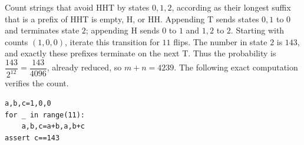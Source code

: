 Count strings that avoid HHT by states $0,1,2$, according as their longest suffix that is a prefix of HHT is empty, H, or HH. Appending T sends states $0,1$ to $0$ and terminates state $2$; appending H sends $0$ to $1$ and $1,2$ to $2$. Starting with counts $(1,0,0)$, iterate this transition for $11$ flips. The number in state $2$ is $143$, and exactly these prefixes terminate on the next T. Thus the probability is $\dfrac{143}{2^{12}}=\dfrac{143}{4096}$, already reduced, so $m+n=\boxed{4239}$. The following exact computation verifies the count.
\begin{verbatim}
a,b,c=1,0,0
for _ in range(11):
    a,b,c=a+b,a,b+c
assert c==143
\end{verbatim}
